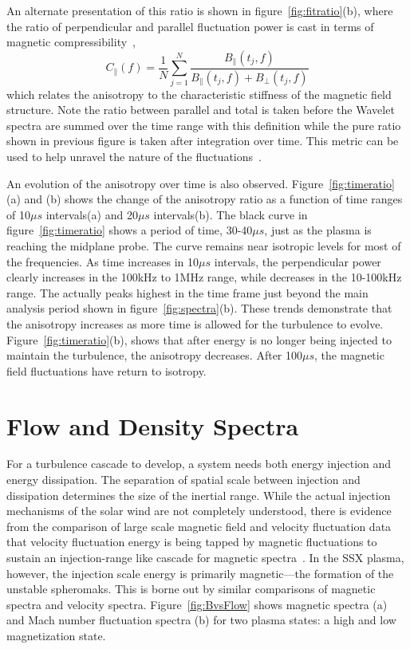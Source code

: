 \documentclass[aip,prl,amsmath,amssymb,reprint,superscriptaddress]{revtex4-1} %
\begin{document}
An alternate presentation of this ratio is shown in figure~\ref{fig:fitratio}(b), where the ratio of perpendicular and parallel fluctuation power is cast in terms of magnetic compressibility~\cite{kiyani13},
\begin{equation}
C_{\parallel}(f) = \frac{1}{N}\sum^{N}_{j=1}\frac{B_{\parallel}(t_{j},f)}{B_{\parallel}(t_{j},f)+B_{\perp}(t_{j},f)}
\label{eq:magcompress}
\end{equation}
which relates the anisotropy to the characteristic stiffness of the magnetic field structure. Note the ratio between parallel and total is taken before the Wavelet spectra are summed over the time range with this definition while the pure ratio shown in previous figure is taken after integration over time. This metric can be used to help unravel the nature of the fluctuations~\cite{tenbarge12,kiyani13}.

An evolution of the anisotropy over time is also observed. Figure~\ref{fig:timeratio}(a) and (b) shows the change of the anisotropy ratio as a function of time ranges of 10$\mu s$ intervals(a) and 20$\mu s$ intervals(b). The black curve in figure~\ref{fig:timeratio} shows a period of time, 30-40$\mu s$, just as the plasma is reaching the midplane probe. The curve remains near isotropic levels for most of the frequencies. As time increases in 10$\mu s$ intervals, the perpendicular power clearly increases in the 100kHz to 1MHz range, while decreases in the 10-100kHz range. The actually peaks highest in the time frame just beyond the main analysis period shown in figure~\ref{fig:spectra}(b). These trends demonstrate that the anisotropy increases as more time is allowed for the turbulence to evolve. Figure~\ref{fig:timeratio}(b), shows that after energy is no longer being injected to maintain the turbulence, the anisotropy decreases. After 100$\mu s$, the magnetic field fluctuations have return to isotropy.

\section{Flow and Density Spectra}

For a turbulence cascade to develop, a system needs both energy injection and energy dissipation. The separation of spatial scale between injection and dissipation determines the size of the inertial range. While the actual injection mechanisms of the solar wind are not completely understood, there is evidence from the comparison of large scale magnetic field and velocity fluctuation data that velocity fluctuation energy is being tapped by magnetic fluctuations to sustain an injection-range like cascade for magnetic spectra~\cite{roberts10}. In the SSX plasma, however, the injection scale energy is primarily magnetic---the formation of the unstable spheromaks. This is borne out by similar comparisons of magnetic spectra and velocity spectra. Figure~\ref{fig:BvsFlow} shows magnetic spectra (a) and Mach number fluctuation spectra (b) for two plasma states: a high and low magnetization state.
\end{document}
